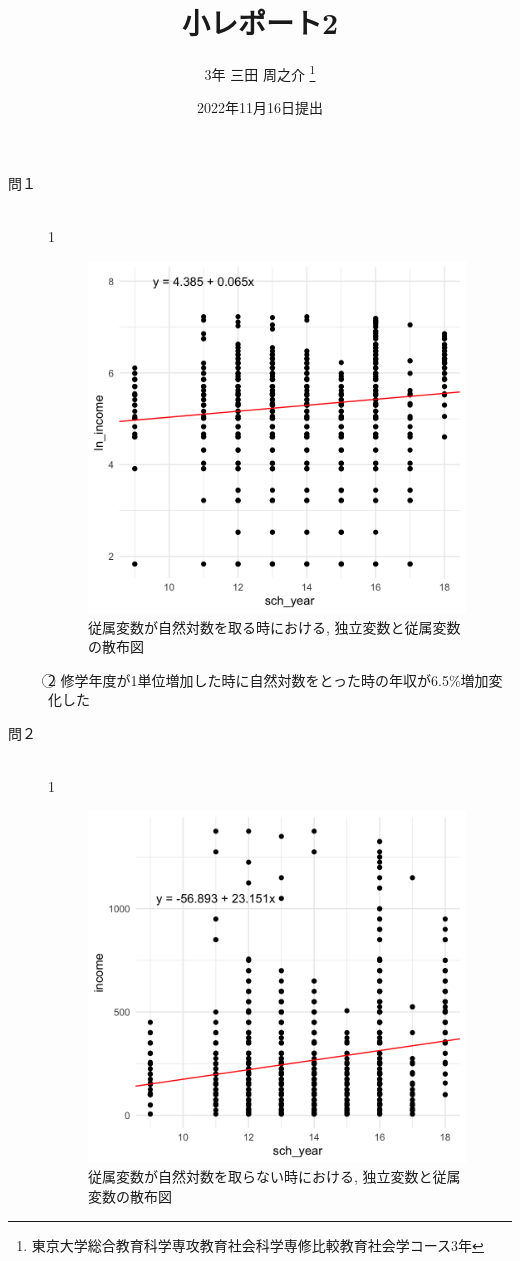 \documentclass[10pt,leqno]{jarticle}%
\begin{document}
 
\title{小レポート2} 
\author{3年 三田 周之介 \thanks{東京大学総合教育科学専攻教育社会科学専修比較教育社会学コース3年}} 
\date{2022年11月16日提出}  %
\maketitle

\begin{description}
   \item[問１]\mbox{}\\
\textcircled{\scriptsize 1}
\begin{figure}[H]
  \centering
  \includegraphics[width=10cm]{q1.png}
  \caption{従属変数が自然対数を取る時における, 独立変数と従属変数の散布図}
\end{figure}

\textcircled{\scriptsize 2} 
修学年度が1単位増加した時に自然対数をとった時の年収が6.5\%増加変化した

   \item[問２]\mbox{}\\
\textcircled{\scriptsize 1}
\begin{figure}[H]
  \centering
  \includegraphics[width=10cm]{q2.png}
  \caption{従属変数が自然対数を取らない時における, 独立変数と従属変数の散布図}
\end{figure}


\end{description}
\end{document}
